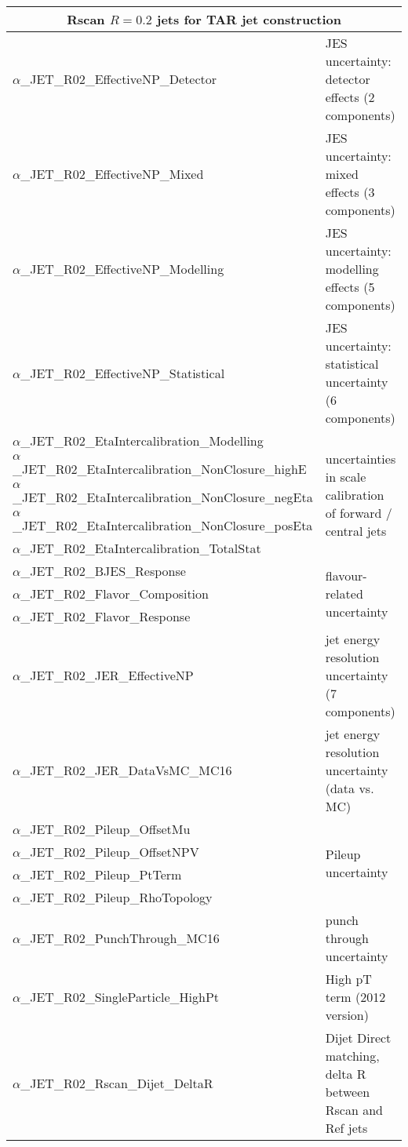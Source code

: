 {\begin{longtable}{p{7cm} p{8cm}}
\multicolumn{2}{c}{\textbf{Rscan \(R=0.2\) jets for TAR jet construction }}  \\
\midrule
\(\alpha\)\_JET\_R02\_EffectiveNP\_Detector   & JES uncertainty: detector effects (2 components)        \\
\(\alpha\)\_JET\_R02\_EffectiveNP\_Mixed      & JES uncertainty: mixed effects (3 components)            \\
\(\alpha\)\_JET\_R02\_EffectiveNP\_Modelling  & JES uncertainty: modelling effects (5 components)         \\
\(\alpha\)\_JET\_R02\_EffectiveNP\_Statistical  & JES uncertainty: statistical uncertainty (6 components)         \\
\(\alpha\)\_JET\_R02\_EtaIntercalibration\_Modelling            & \multirow{5}{*}{uncertainties in scale calibration of forward / central jets}  \\
\(\alpha\)\_JET\_R02\_EtaIntercalibration\_NonClosure\_highE    &  \\
\(\alpha\)\_JET\_R02\_EtaIntercalibration\_NonClosure\_negEta  &   \\
\(\alpha\)\_JET\_R02\_EtaIntercalibration\_NonClosure\_posEta  &  \\
\(\alpha\)\_JET\_R02\_EtaIntercalibration\_TotalStat &  \\
\(\alpha\)\_JET\_R02\_BJES\_Response      & \multirow{3}{*}{flavour-related uncertainty}  \\
\(\alpha\)\_JET\_R02\_Flavor\_Composition &   \\
\(\alpha\)\_JET\_R02\_Flavor\_Response    &  \\
\(\alpha\)\_JET\_R02\_JER\_EffectiveNP    & jet energy resolution uncertainty (7 components)  \\
\(\alpha\)\_JET\_R02\_JER\_DataVsMC\_MC16 & jet energy resolution uncertainty (data vs. MC)  \\
\(\alpha\)\_JET\_R02\_Pileup\_OffsetMu    &  \multirow{4}{*}{Pileup uncertainty}  \\
\(\alpha\)\_JET\_R02\_Pileup\_OffsetNPV   &  \\
\(\alpha\)\_JET\_R02\_Pileup\_PtTerm &  \\
\(\alpha\)\_JET\_R02\_Pileup\_RhoTopology &   \\
\(\alpha\)\_JET\_R02\_PunchThrough\_MC16 & punch through uncertainty  \\
\(\alpha\)\_JET\_R02\_SingleParticle\_HighPt  & High pT term (2012 version)  \\
\(\alpha\)\_JET\_R02\_Rscan\_Dijet\_DeltaR & Dijet Direct matching, delta R between Rscan and Ref jets  \\

\end{longtable}}
